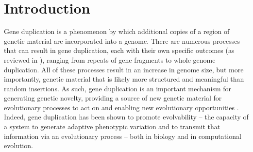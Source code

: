 \section{Introduction} \label{sec:introduction}

Gene duplication is a phenomenon by which
additional copies of a region of genetic material
are incorporated into a genome. \citep{Ferguson2023}
There are numerous processes that can result in gene duplication, each with their own specific outcomes (as reviewed in \citep{Zhang:2003fw}), ranging from repeats of gene fragments to whole genome duplication.  All of these processes result in %
an increase in genome size, but more importantly, genetic material that is likely more structured and meaningful than random insertions. %
As such, gene duplication is an important mechanism for generating genetic novelty, providing a source of new genetic material for evolutionary processes to act on and enabling new evolutionary opportunities \citep{Zhang:2003fw,Crow:2006role,Magadum:2013wu}. Indeed, gene duplication has been shown to promote evolvability -- the capacity of a system to generate adaptive phenotypic variation %
and to transmit that information via an evolutionary process \citep{Hu:2010ea} -- both in biology and in computational evolution.  %

